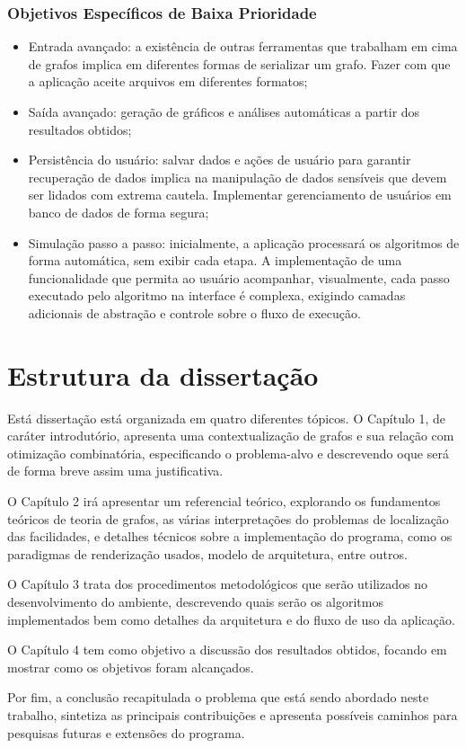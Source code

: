 \subsubsection{Objetivos Específicos de Baixa Prioridade}
\begin{itemize}
    \item Entrada avançado: a existência de outras ferramentas que trabalham em cima de grafos implica em diferentes formas de serializar um grafo. Fazer com que a aplicação aceite arquivos em diferentes formatos;
    
    \item Saída avançado: geração de gráficos e análises automáticas a partir dos resultados obtidos;
    
    \item Persistência do usuário: salvar dados e ações de usuário para garantir recuperação de dados implica na manipulação de dados sensíveis que devem ser lidados com extrema cautela. Implementar gerenciamento de usuários em banco de dados de forma segura;
    
    \item Simulação passo a passo: inicialmente, a aplicação processará os algoritmos de forma automática, sem exibir cada etapa. A implementação de uma funcionalidade que permita ao usuário acompanhar, visualmente, cada passo executado pelo algoritmo na interface é complexa, exigindo camadas adicionais de abstração e controle sobre o fluxo de execução.
\end{itemize}

\section{Estrutura da dissertação}
Está dissertação está organizada em quatro diferentes tópicos. O Capítulo 1, 
de caráter introdutório, apresenta uma contextualização de grafos e sua relação com otimização combinatória,
especificando o problema-alvo e descrevendo oque será de forma breve assim uma justificativa.


O Capítulo 2 irá apresentar um referencial teórico, explorando os fundamentos 
teóricos de teoria de grafos, as várias interpretações do problemas de localização das facilidades, e 
detalhes técnicos sobre a implementação do programa, como os paradigmas de renderização usados,
modelo de arquitetura, entre outros. 

O Capítulo 3 trata dos procedimentos metodológicos que serão utilizados no desenvolvimento do ambiente, 
descrevendo quais serão os algoritmos implementados bem como detalhes da arquitetura e do fluxo de uso da aplicação.

O Capítulo 4 tem como objetivo a discussão dos resultados obtidos, 
focando em mostrar como os objetivos foram alcançados.  

Por fim, a conclusão recapitulada o problema que está
sendo abordado neste trabalho, sintetiza as principais contribuições e apresenta 
possíveis caminhos para pesquisas futuras e extensões do programa.


